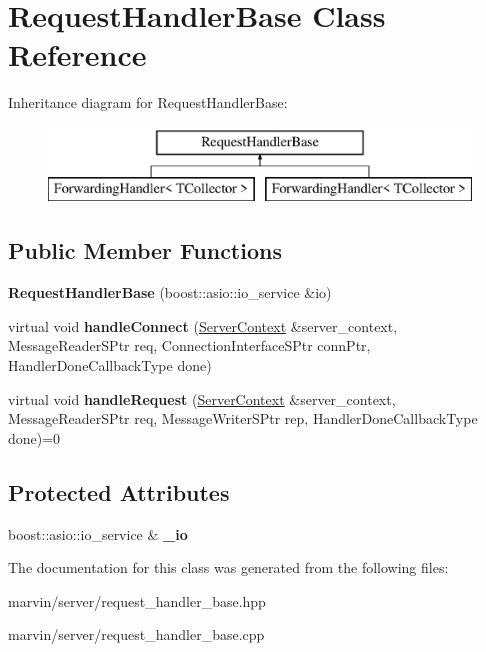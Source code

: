 \hypertarget{class_request_handler_base}{}\section{Request\+Handler\+Base Class Reference}
\label{class_request_handler_base}
Inheritance diagram for Request\+Handler\+Base\+:\begin{figure}[H]
\begin{center}
\leavevmode
\includegraphics[height=2.000000cm]{class_request_handler_base}
\end{center}
\end{figure}
\subsection*{Public Member Functions}
\begin{DoxyCompactItemize}
\item 
\mbox{\label{class_request_handler_base_af49294d2f3435b9618738e3f9d62e34d}} 
{\bfseries Request\+Handler\+Base} (boost\+::asio\+::io\+\_\+service \&io)
\item 
\mbox{\label{class_request_handler_base_a0864015433e1c4001bd820b3f9127c65}} 
virtual void {\bfseries handle\+Connect} (\hyperlink{struct_server_context}{Server\+Context} \&server\+\_\+context, Message\+Reader\+S\+Ptr req, Connection\+Interface\+S\+Ptr conn\+Ptr, Handler\+Done\+Callback\+Type done)
\item 
\mbox{\label{class_request_handler_base_a4aafaf3189fd47439d4636dbf830f3e6}} 
virtual void {\bfseries handle\+Request} (\hyperlink{struct_server_context}{Server\+Context} \&server\+\_\+context, Message\+Reader\+S\+Ptr req, Message\+Writer\+S\+Ptr rep, Handler\+Done\+Callback\+Type done)=0
\end{DoxyCompactItemize}
\subsection*{Protected Attributes}
\begin{DoxyCompactItemize}
\item 
\mbox{\label{class_request_handler_base_a7dc27fb1e0097c2bdc3dc4060e9d9c87}} 
boost\+::asio\+::io\+\_\+service \& {\bfseries \+\_\+io}
\end{DoxyCompactItemize}


The documentation for this class was generated from the following files\+:\begin{DoxyCompactItemize}
\item 
marvin/server/request\+\_\+handler\+\_\+base.\+hpp\item 
marvin/server/request\+\_\+handler\+\_\+base.\+cpp\end{DoxyCompactItemize}
